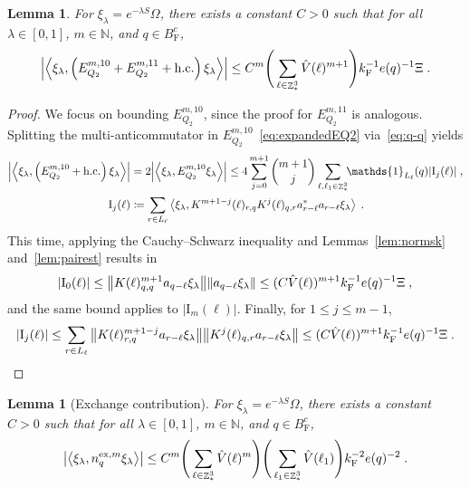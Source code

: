 \documentclass[12pt,a4paper]{article}
\numberwithin{equation}{section}
\newcommand{\NNN}{\mathbb{N}}
\newcommand{\1}{\mathbb{I}}
\newcommand{\ex}{\mathrm{ex}}
\newcommand{\F}{\mathrm{F}}
\newcommand{\I}{\mathrm{I}}
\DeclareMathOperator{\Z}{\mathbb{Z}}
\newcommand{\eva}[1]{\left\langle #1 \right\rangle}
\theoremstyle{plain}
\newtheorem{lemma}[theorem]{Lemma}
\theoremstyle{definition}
\theoremstyle{remark}
\theoremstyle{plain}
\theoremstyle{definition}
\theoremstyle{remark}
\begin{document}
\begin{lemma} \label{lem:EQ212}
For $\xi_\lambda = e^{-\lambda S} \Omega$, there exists a constant $ C > 0 $ such that for all $ \lambda \in [0,1] $, $ m \in \NNN $, and $ q \in B_{\F}^c $,
\begin{equation}
	\abs{\eva{\xi_\lambda,\left(E^{m,10}_{Q_2}+E^{m,11}_{Q_2}+\mathrm{h.c.}\right) \xi_\lambda }}
	\leq C^m \Bigg( \sum\limits_{\ell \in \Z^3_*} \hat{V}(\ell)^{m+1} \Bigg)
		k_{\F}^{-1} e(q)^{-1} \Xi \;. \label{eq:estEQ212}
\end{equation}
\end{lemma}

\begin{proof}
We focus on bounding $ E^{m,10}_{Q_2} $, since the proof for $ E^{m,11}_{Q_2} $ is analogous.
Splitting the multi-anticommutator in $ E^{m,10}_{Q_2} $~\eqref{eq:expandedEQ2} via~\eqref{eq:q-q} yields
\begin{equation} \label{eq:EQ2121}
\begin{aligned}
	\abs{\eva{\xi_\lambda,\left(E^{m,10}_{Q_2}+\mathrm{h.c.}\right) \xi_\lambda }} 
	&= 2\abs{\eva{\xi_\lambda, E^{m,10}_{Q_2} \xi_\lambda }}
	\le 4 \sum_{j=0}^{m+1} {{m+1}\choose j} \sum\limits_{\ell,\ell_1  \in \Z^3_*}\!\! \mathds{1}_{L_\ell}(q) |\I_j(\ell)| \;,\\
	\I_j(\ell)
	&\coloneq \sum\limits_{r\in L_{\ell}}
		\eva{\xi_\lambda, K^{m+1-j}(\ell)_{r,q} K^{j}(\ell)_{q,r} a^*_{r-\ell} a_{r-\ell} \xi_\lambda} \;. \\
\end{aligned}
\end{equation}
This time, applying the Cauchy--Schwarz inequality and Lemmas~\ref{lem:normsk} and~\ref{lem:pairest} results in
\begin{equation}
	|\I_0(\ell)|
	\leq \norm{ K(\ell)^{m+1}_{q,q} a_{q-\ell} \xi_\lambda}\norm{ a_{q-\ell} \xi_\lambda }
	\leq (C \hat{V}(\ell))^{m+1}
		k_{\F}^{-1} e(q)^{-1} \Xi \;,\label{eq:estEQ2121}
\end{equation}
and the same bound applies to $ |\I_m(\ell)| $. Finally, for $ 1 \le j \le m-1 $,
\begin{equation}
	|\I_j(\ell)|
	\leq \sum\limits_{r \in L_{\ell}} \norm{ K(\ell)^{m+1-j}_{r,q} a_{r-\ell}\xi_\lambda}\norm{ K^j(\ell)_{q,r} a_{r-\ell} \xi_\lambda }
	\leq (C \hat{V}(\ell))^{m+1}
		k_{\F}^{-1} e(q)^{-1} \Xi \;. \label{eq:estEQ2122}
\end{equation}
\end{proof}

\begin{lemma}[Exchange contribution] \label{lem:estnqex}
For $\xi_\lambda = e^{-\lambda S} \Omega$, there exists a constant $ C > 0 $ such that for all $ \lambda \in [0,1] $, $ m \in \NNN $, and $ q \in B_{\F}^c $,
\begin{equation}
	\abs{\eva{\xi_\lambda, n_q^{\ex,m} \xi_\lambda }}
	\leq C^m \Bigg( \sum\limits_{\ell \in \Z^3_*} \hat{V}(\ell)^m \Bigg)
		\Bigg( \sum\limits_{\ell_1 \in \Z^3_*} \hat{V}(\ell_1) \Bigg)
		k_{\F}^{-2} e(q)^{-2} \;. \label{eq:estnqex}
\end{equation}
\end{lemma}
\end{document}
